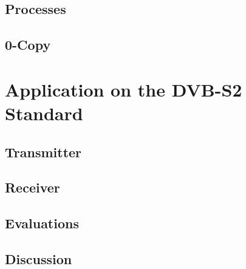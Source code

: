 \subsection{Processes}

\subsection{0-Copy}

\section{Application on the DVB-S2 Standard}

\subsection{Transmitter}

\subsection{Receiver}

\subsection{Evaluations}

\subsection{Discussion}